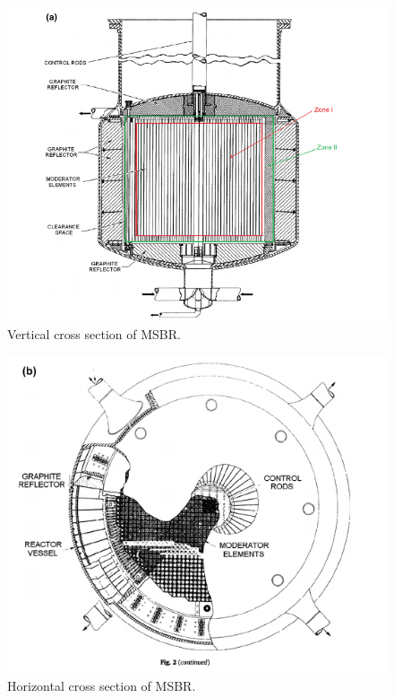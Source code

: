 \documentclass{article}
\begin{document}
\begin{figure}[htpb]
  \centering
  \includegraphics{vertical_MSBR_cross_section.png}
  \caption{Vertical cross section of MSBR.}
  \label{fig:vertical}
\end{figure}
\begin{figure}[htpb]
  \centering
  \includegraphics{horizontal_MSBR_cross_section.png}
  \caption{Horizontal cross section of MSBR.}
  \label{fig:horizontal}
\end{figure}
\end{document}
